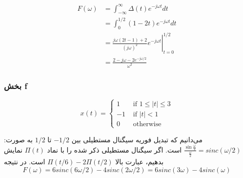 \documentclass[12pt]{article}
\begin{document}
$$
\begin{aligned}
	F(\omega) &=\int_{-\infty}^{\infty} \Delta(t) e^{-j \omega t} d t \\
	&=\int_{0}^{1 / 2}(1-2 t) e^{-j \omega t} d t \\
	&=\left.\frac{j \omega(2 t-1)+2}{(j \omega)^{2}} e^{-j \omega t}\right|_{t=0} ^{1 / 2} \\
	&=\frac{2-j \omega-2 e^{-j \omega / 2}}{\omega^{2}}
\end{aligned}
$$

\subsubsection{بخش f}

$$
x(t)=\left\{\begin{aligned}
	1 & \text { if } 1 \leq|t| \leq 3 \\
	-1 & \text { if }|t|<1 \\
	0 & \text { otherwise }
\end{aligned}\right.
$$

می‌دانیم که تبدیل فوریه سیگنال مستطیلی بین $-1/2$ تا $1/2$ به صورت:
$\frac{\sin \frac{\omega }{2}}{\frac{\omega}{2}} = sinc (\omega/2)$
است. اگر سیگنال مستطیلی ذکر شده را با نماد $\Pi(t)$ نمایش بدهیم، عبارت بالا
$\Pi(t/6) - 2\Pi (t/2)$
است. در نتیجه
$$F(\omega) = 6sinc(6 \omega/2) - 4 sinc(2 \omega /2) = 6sinc(3\omega) - 4 sinc(\omega)$$
\end{document}
